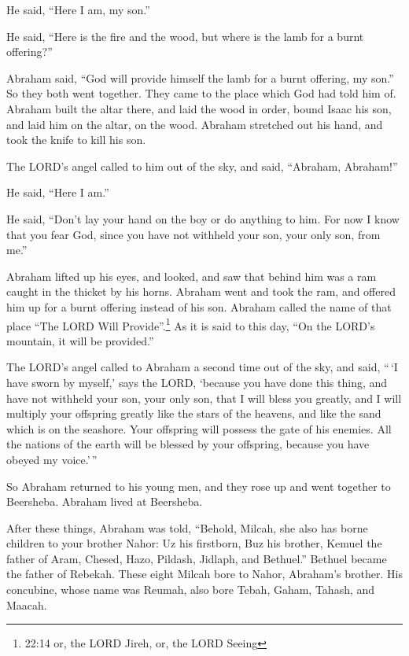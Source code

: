 He said, ``Here I am, my son.''

He said, ``Here is the fire and the wood, but where is the lamb for a
burnt offering?''

 Abraham said, ``God will provide himself the lamb for a
burnt offering, my son.'' So they both went together.  They
came to the place which God had told him of. Abraham built the altar
there, and laid the wood in order, bound Isaac his son, and laid him on
the altar, on the wood.  Abraham stretched out his hand,
and took the knife to kill his son.

 The LORD's angel called to him out of the sky, and said,
``Abraham, Abraham!''

He said, ``Here I am.''

 He said, ``Don't lay your hand on the boy or do anything
to him. For now I know that you fear God, since you have not withheld
your son, your only son, from me.''

 Abraham lifted up his eyes, and looked, and saw that
behind him was a ram caught in the thicket by his horns. Abraham went
and took the ram, and offered him up for a burnt offering instead of his
son.  Abraham called the name of that place ``The LORD Will
Provide''.\footnote{22:14 or, the LORD Jireh, or, the LORD Seeing} As it
is said to this day, ``On the LORD's mountain, it will be provided.''

 The LORD's angel called to Abraham a second time out of
the sky,  and said, ``\,`I have sworn by myself,' says the
LORD, `because you have done this thing, and have not withheld your son,
your only son,  that I will bless you greatly, and I will
multiply your offspring greatly like the stars of the heavens, and like
the sand which is on the seashore. Your offspring will possess the gate
of his enemies.  All the nations of the earth will be
blessed by your offspring, because you have obeyed my voice.'\,''

 So Abraham returned to his young men, and they rose up and
went together to Beersheba. Abraham lived at Beersheba.

 After these things, Abraham was told, ``Behold, Milcah,
she also has borne children to your brother Nahor:  Uz his
firstborn, Buz his brother, Kemuel the father of Aram, 
Chesed, Hazo, Pildash, Jidlaph, and Bethuel.''  Bethuel
became the father of Rebekah. These eight Milcah bore to Nahor,
Abraham's brother.  His concubine, whose name was Reumah,
also bore Tebah, Gaham, Tahash, and Maacah.

